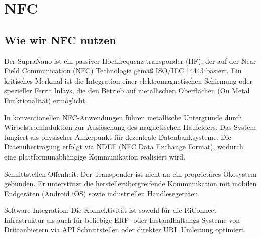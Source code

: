 %
%
%


\chapter{NFC}

\section{Wie wir NFC nutzen}
Der SupraNano ist ein passiver Hochfrequenz transponder (HF), der auf der Near Field Communication (NFC) Technologie gemäß ISO/IEC 14443 basiert. Ein kritisches Merkmal ist die Integration einer elektromagnetischen Schirmung oder spezieller Ferrit Inlays, die den Betrieb auf metallischen Oberflächen (On Metal Funktionalität) ermöglicht.

In konventionellen NFC-Anwendungen führen metallische Untergründe durch Wirbelstrominduktion zur Auslöschung des magnetischen Haufelders.
Das System fungiert als physischer Ankerpunkt für dezentrale Datenbanksysteme. Die Datenübertragung erfolgt via NDEF (NFC Data Exchange Format), wodurch eine plattformunabhängige Kommunikation realisiert wird.
\begin{itemize}{
 \item Schnittstellen-Offenheit: Der Transponder ist nicht an ein proprietäres Ökosystem gebunden. Er unterstützt die herstellerübergreifende Kommunikation mit mobilen Endgeräten (Android iOS) sowie industriellen Handlesegeräten.

\item Software Integration: Die Konnektivität ist sowohl für die RiConnect Infrastruktur als auch für beliebige ERP- oder Instandhaltungs-Systeme von Drittanbietern via API Schnittstellen oder direkter URL Umleitung optimiert.
} \end{itemize}

